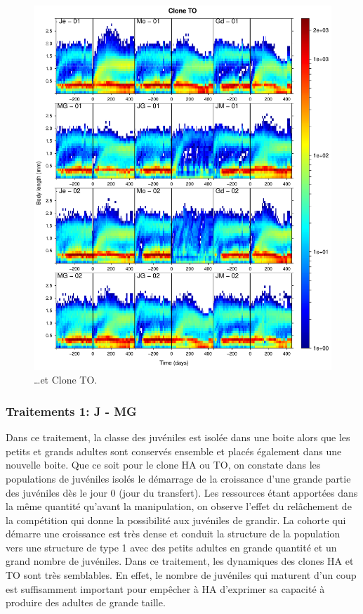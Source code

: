 {{\begin{figure}[p]
		\includegraphics[width=\textwidth]{1_CorpsDeThese/Resumes/Fig/SM03b}
        \caption*{\ldots et Clone TO.}
    \end{figure}
    \clearpage
    }%
}

\subsubsection{Traitements 1: J - MG}

Dans ce traitement, la classe des juvéniles est isolée dans une boite alors que
les petits et grands adultes sont conservés ensemble et placés également dans
une nouvelle boite. Que ce soit pour le clone HA ou TO, on constate dans les
populations de juvéniles isolés le démarrage de la croissance d'une grande
partie des juvéniles dès le jour 0 (jour du transfert). Les ressources étant
apportées dans la même quantité qu'avant la manipulation, on observe l'effet du
relâchement de la compétition qui donne la possibilité aux juvéniles de grandir.
La cohorte qui démarre une croissance est très dense et conduit la structure de
la population vers une structure de type 1 avec des petits adultes en grande
quantité et un grand nombre de juvéniles. Dans ce traitement, les dynamiques des
clones HA et TO sont très semblables. En effet, le nombre de juvéniles qui
maturent d'un coup est suffisamment important pour empêcher à HA d'exprimer sa
capacité à produire des adultes de grande taille. 

